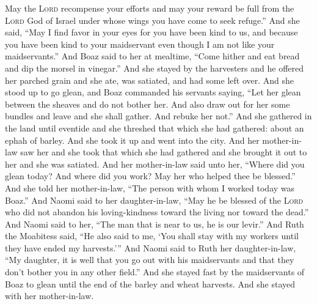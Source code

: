 \begin{inparaenum}
   May the \textsc{Lord} recompense your efforts and may your reward be full from the \textsc{Lord} God of Israel under whose wings you have come to seek refuge.''%
   And she said, ``May I find favor in your eyes for you have been kind to us, and because you have been kind to your maidservant even though I am not like your maidservants.''%
   And Boaz said to her at mealtime, ``Come hither and eat bread and dip the morsel in vinegar.'' And she stayed by the harvesters and he offered her parched grain and she ate, was satiated, and had some left over.%
   And she stood up to go glean, and Boaz commanded his servants saying, ``Let her glean between the sheaves and do not bother her.%
   And also draw out for her some bundles and leave and she shall gather. And rebuke her not.''%
   And she gathered in the land until eventide and she threshed that which she had gathered: about an ephah of barley.%
   And she took it up and went into the city. And her mother-in-law saw her and she took that which she had gathered and she brought it out to her and she was satiated.%
   And her mother-in-law said unto her, ``Where did you glean today? And where did you work? May her who helped thee be blessed.'' And she told her mother-in-law, ``The person with whom I worked today was Boaz.''%
   And Naomi said to her daughter-in-law, ``May he be blessed of the \textsc{Lord} who did not abandon his loving-kindness toward the living nor toward the dead.'' And Naomi said to her, ``The man that is near to us, he is our levir.''%
   And Ruth the Moabitess said, ``He also said to me, `You shall stay with my workers until they have ended my harvests.'''%
   And Naomi said to Ruth her daughter-in-law, ``My daughter, it is well that you go out with his maidservants and that they don't bother you in any other field.''%
   And she stayed fast by the maidservants of Boaz to glean until the end of the barley and wheat harvests. And she stayed with her mother-in-law.%
\end{inparaenum}
